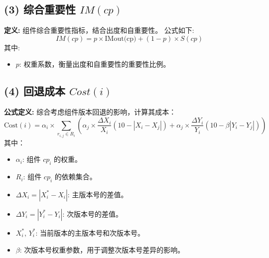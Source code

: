 \documentclass[14pt,a4paper,UTF8,twoside]{article}
\begin{document}
\subsection*{(3) 综合重要性 \(IM(cp)\)}
\textbf{定义:} 组件综合重要性指标，结合出度和自重要性。  
公式如下:
\[
IM(cp) = p \times \text{IMout(cp)} + (1-p) \times S(cp)
\]
其中:
\begin{itemize}
    \item \(p\): 权重系数，衡量出度和自重要性的重要性比例。
\end{itemize}

\subsection*{(4) 回退成本 \(Cost(i)\)}
\textbf{公式定义:} 综合考虑组件版本回退的影响，计算其成本：
\[
\text{Cost}(i) = \alpha_i \times \sum_{r_{i,j} \in R_i} \left( \alpha_j \times \frac{\Delta X_i}{X_i} (10 - |X_i - X_j|) + \alpha_j \times \frac{\Delta Y_i}{Y_i} (10 - \beta |Y_i - Y_j|) \right)
\]
其中：
\begin{itemize}
    \item \(\alpha_i\): 组件 \(cp_i\) 的权重。
    \item \(R_i\): 组件 \(cp_i\) 的依赖集合。
    \item \(\Delta X_i = |X_i^* - X_i|\): 主版本号的差值。
    \item \(\Delta Y_i = |Y_i^* - Y_i|\): 次版本号的差值。
    \item \(X_i^*\), \(Y_i^*\): 当前版本的主版本号和次版本号。
    \item \(\beta\): 次版本号权重参数，用于调整次版本号差异的影响。
\end{itemize}
\end{document}
